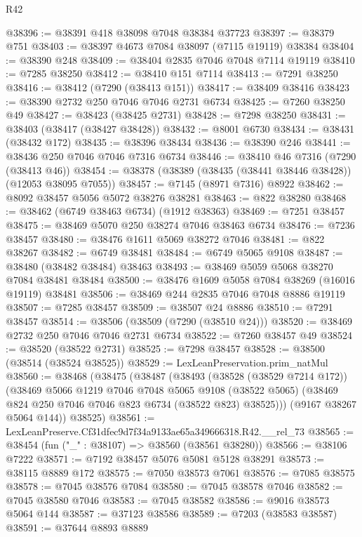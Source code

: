 \begin{lexlean}{R42}
\begin{coremodule}
{@38396 := @38391 @418 @38098 @7048 @38384 @37723
@38397 := @38379 @751
@38403 := @38397 @4673 @7084 @38097 (@7115 @19119) @38384
@38404 := @38390 @248
@38409 := @38404 @2835 @7046 @7048 @7114 @19119
@38410 := @7285 @38250
@38412 := @38410 @151 @7114
@38413 := @7291 @38250
@38416 := @38412 (@7290 (@38413 @151))
@38417 := @38409 @38416
@38423 := @38390 @2732 @250 @7046 @7046 @2731 @6734
@38425 := @7260 @38250 @49
@38427 := @38423 (@38425 @2731)
@38428 := @7298 @38250
@38431 := @38403 (@38417 (@38427 @38428))
@38432 := @8001 @6730
@38434 := @38431 (@38432 @172)
@38435 := @38396 @38434
@38436 := @38390 @246
@38441 := @38436 @250 @7046 @7046 @7316 @6734
@38446 := @38410 @46 @7316 (@7290 (@38413 @46))
@38454 := @38378 (@38389 (@38435 (@38441 @38446 @38428)) (@12053 @38095 @7055))
@38457 := @7145 (@8971 @7316) @8922
@38462 := @8092 @38457 @5056 @5072 @38276 @38281
@38463 := @822 @38280
@38468 := @38462 (@6749 @38463 @6734) (@1912 @38363)
@38469 := @7251 @38457
@38475 := @38469 @5070 @250 @38274 @7046 @38463 @6734
@38476 := @7236 @38457
@38480 := @38476 @1611 @5069 @38272 @7046
@38481 := @822 @38267
@38482 := @6749 @38481
@38484 := @6749 @5065 @9108
@38487 := @38480 (@38482 @38484) @38463
@38493 := @38469 @5059 @5068 @38270 @7084 @38481 @38484
@38500 := @38476 @1609 @5058 @7084 @38269 (@16016 @19119) @38481
@38506 := @38469 @244 @2835 @7046 @7048 @8886 @19119
@38507 := @7285 @38457
@38509 := @38507 @24 @8886
@38510 := @7291 @38457
@38514 := @38506 (@38509 (@7290 (@38510 @24)))
@38520 := @38469 @2732 @250 @7046 @7046 @2731 @6734
@38522 := @7260 @38457 @49
@38524 := @38520 (@38522 @2731)
@38525 := @7298 @38457
@38528 := @38500 (@38514 (@38524 @38525))
@38529 := LexLeanPreservation.prim_natMul
@38560 := @38468
    (@38475
      (@38487
        (@38493
          (@38528 (@38529 @7214 @172))
          (@38469
            @5066
            @1219
            @7046
            @7048
            @5065
            @9108
            (@38522 @5065)
            (@38469 @824 @250 @7046 @7046 @823 @6734 (@38522 @823) @38525)))
        (@9167 @38267 @5064 @144))
      @38525)
@38561 := LexLeanPreserve.Cf31dfec9d7f34a9133ae65a349666318.R42.__rel_73
@38565 := @38454 (fun ("_" : @38107) => @38560 (@38561 @38280))
@38566 := @38106 @7222
@38571 := @7192 @38457 @5076 @5081 @5128 @38291
@38573 := @38115 @8889 @172
@38575 := @7050 @38573 @7061
@38576 := @7085 @38575
@38578 := @7045 @38576 @7084
@38580 := @7045 @38578 @7046
@38582 := @7045 @38580 @7046
@38583 := @7045 @38582
@38586 := @9016 @38573 @5064 @144
@38587 := @37123 @38586
@38589 := @7203 (@38583 @38587)
@38591 := @37644 @8893 @8889
}
\end{coremodule}
\end{lexlean}
